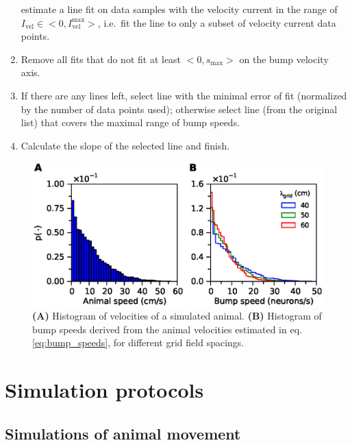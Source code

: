 \documentclass[a4paper,12pt]{article}
\begin{document}
\begin{enumerate}
        estimate a line fit on data samples with the velocity current in the
        range of $I_{\text{vel}} \in <0, I_{\text{vel}}^{\text{max}}>$, i.e.\ 
        fit the line to only a subset of velocity current data points.
    \item Remove all fits that do not fit at least $<0, s_{\text{max}}>$ on the
        bump velocity axis.
    \item If there are any lines left, select line with the minimal error
        of fit (normalized by the number of data points used); otherwise select
        line (from the original list) that covers the maximal range of bump
        speeds.
    \item Calculate the slope of the selected line and finish.
\end{enumerate}

\renewcommand{\figurename}{Supplementary Methods Figure}
\begin{figure}[th]
    \begin{center}
        \includegraphics[trim=0 0.6cm 0 0 ]{fig/velocity_histograms}
    \end{center}
    \internallinenumbers
    \caption{\textbf{(A)} Histogram of velocities of a simulated animal.
    \textbf{(B)} Histogram of bump speeds derived from the animal velocities
    estimated in eq. \eqref{eq:bump_speeds}, for different grid field spacings.}
    \label{fig:velocity_histograms}
\end{figure}


\section{Simulation protocols} \label{sec:noise_protocols}

\subsection{Simulations of animal movement} \label{sec:noise_grids_protocol}
\end{document}
